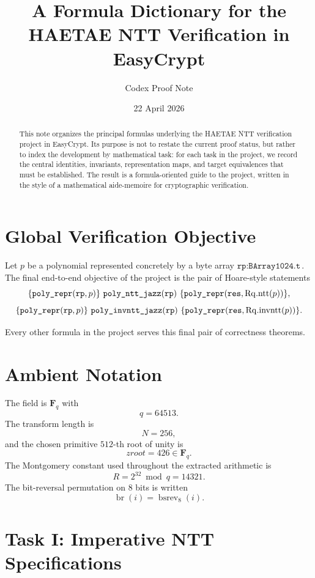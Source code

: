 \documentclass[11pt]{article}
\title{A Formula Dictionary for the HAETAE NTT Verification in EasyCrypt}
\author{Codex Proof Note}
\date{22 April 2026}
\newcommand{\code}[1]{\text{\texttt{#1}}}
\begin{document}
\maketitle

\begin{abstract}
This note organizes the principal formulas underlying the HAETAE NTT
verification project in EasyCrypt. Its purpose is not to restate the current
proof status, but rather to index the development by mathematical task: for
each task in the project, we record the central identities, invariants,
representation maps, and target equivalences that must be established. The
result is a formula-oriented guide to the project, written in the style of a
mathematical aide-memoire for cryptographic verification.
\end{abstract}

\section{Global Verification Objective}

Let \(p\) be a polynomial represented concretely by a byte array
\(\texttt{rp} : \texttt{BArray1024.t}\). The final end-to-end objective of the
project is the pair of Hoare-style statements
\[
\{\code{poly\_repr}(\texttt{rp},p)\}
\ \texttt{poly\_ntt\_jazz}(\texttt{rp})\
\{\code{poly\_repr}(\texttt{res}, \mathrm{Rq.ntt}(p))\},
\]
\[
\{\code{poly\_repr}(\texttt{rp},p)\}
\ \texttt{poly\_invntt\_jazz}(\texttt{rp})\
\{\code{poly\_repr}(\texttt{res}, \mathrm{Rq.invntt}(p))\}.
\]

Every other formula in the project serves this final pair of correctness
theorems.

\section{Ambient Notation}

The field is \(\mathbf{F}_q\) with
\[
q = 64513.
\]
The transform length is
\[
N = 256,
\]
and the chosen primitive \(512\)-th root of unity is
\[
zroot = 426 \in \mathbf{F}_q.
\]
The Montgomery constant used throughout the extracted arithmetic is
\[
R = 2^{32} \bmod q = 14321.
\]
The bit-reversal permutation on \(8\) bits is written
\[
\operatorname{br}(i) = \operatorname{bsrev}_8(i).
\]

\section{Task I: Imperative NTT Specifications}
\end{document}
